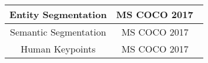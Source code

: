 \begin{table}[b]
{\begin{tabular}{c|c|c }
        Entity Segmentation & \multicolumn{2}{c}{MS COCO 2017~\cite{lin2015microsoftcococommonobjects}} \\
        \hline

        Semantic Segmentation & \multicolumn{2}{c}{MS COCO 2017~\cite{lin2015microsoftcococommonobjects}} \\
        \hline
        Human Keypoints & \multicolumn{2}{c}{MS COCO 2017~\cite{lin2015microsoftcococommonobjects}} \\
        \hline
        
        
    \end{tabular}
    }
    \label{tab:data}
\end{table}